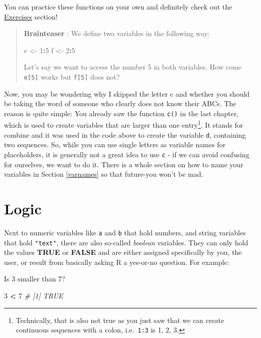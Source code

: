\documentclass[
]{book}
\newenvironment{Shaded}{\begin{snugshade}}{\end{snugshade}}
\newcommand{\CommentTok}[1]{\textcolor[rgb]{0.56,0.35,0.01}{\textit{#1}}}
\newcommand{\DecValTok}[1]{\textcolor[rgb]{0.00,0.00,0.81}{#1}}
\newcommand{\NormalTok}[1]{#1}
\newcommand{\OtherTok}[1]{\textcolor[rgb]{0.56,0.35,0.01}{#1}}
\newcommand{\SpecialCharTok}[1]{\textcolor[rgb]{0.81,0.36,0.00}{\textbf{#1}}}
\begin{document}
You can practice these functions on your own and definitely check out the \hyperref[exercises]{Exercises} section!

\begin{quote}
\textbf{Brainteaser} :
We define two variables in the following way:

\begin{Shaded}
\begin{Highlighting}[]
\NormalTok{e }\OtherTok{\textless{}{-}} \DecValTok{1}\SpecialCharTok{:}\DecValTok{5}
\NormalTok{f }\OtherTok{\textless{}{-}} \DecValTok{2}\SpecialCharTok{:}\DecValTok{5}
\end{Highlighting}
\end{Shaded}

Let's say we want to access the number 5 in both variables.
How come \texttt{e{[}5{]}} works but \texttt{f{[}5{]}} does not?
\end{quote}

Now, you may be wondering why I skipped the letter c and whether you should be taking the word of someone who clearly does not know their ABCs.
The reason is quite simple: You already saw the function \texttt{c()} in the last chapter, which is used to create variables that are larger than one entry\footnote{Technically, that is also not true as you just saw that we can create continuous sequences with a colon, i.e.~\texttt{1:3} is 1, 2, 3.}.
It stands for combine and it was used in the code above to create the variable \texttt{d}, containing two sequences.
So, while you can use single letters as variable names for placeholders, it is generally not a great idea to use \texttt{c} - if we can avoid confusing for ourselves, we want to do it.
There is a whole section on how to name your variables in Section \ref{varnames} so that future-you won't be mad.

\section{Logic}\label{logic}

Next to numeric variables like \texttt{a} and \texttt{b} that hold numbers, and string variables that hold \texttt{"text"}, there are also so-called \emph{boolean} variables.
They can only hold the values \textbf{TRUE} or \textbf{FALSE} and are either assigned specifically by you, the user, or result from basically asking R a yes-or-no question.
For example:

Is 3 smaller than 7?

\begin{Shaded}
\begin{Highlighting}[]
\DecValTok{3} \SpecialCharTok{\textless{}} \DecValTok{7}
\CommentTok{\# [1] TRUE}
\end{Highlighting}
\end{Shaded}
\end{document}
